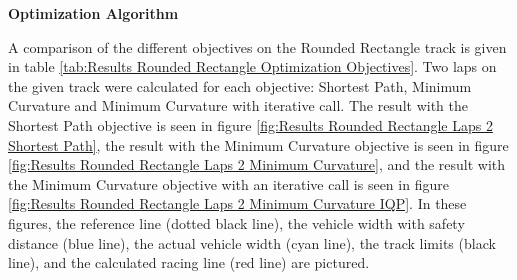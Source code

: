 \textbf{Optimization Algorithm}

A comparison of the different objectives on the Rounded Rectangle track is given in table \ref{tab:Results Rounded Rectangle Optimization Objectives}. Two laps on the given track were calculated for each objective: Shortest Path, Minimum Curvature and Minimum Curvature with iterative call. The result with the Shortest Path objective is seen in figure \ref{fig:Results Rounded Rectangle Laps 2 Shortest Path}, the result with the Minimum Curvature objective is seen in figure \ref{fig:Results Rounded Rectangle Laps 2 Minimum Curvature}, and the result with the Minimum Curvature objective with an iterative call is seen in figure \ref{fig:Results Rounded Rectangle Laps 2 Minimum Curvature IQP}. In these figures, the reference line (dotted black line), the vehicle width with safety distance (blue line), the actual vehicle width (cyan line), the track limits (black line), and the calculated racing line (red line) are pictured.

